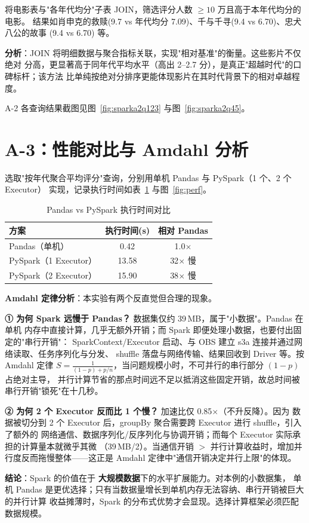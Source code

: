 将电影表与"各年代均分"子表 JOIN，筛选评分人数 $\geq 10$ 万且高于本年代均分的电影。
结果如肖申克的救赎(9.7 vs 年代均分 7.09)、千与千寻(9.4 vs 6.70)、忠犬八公的故事
(9.4 vs 6.70) 等。

\textbf{分析}：JOIN 将明细数据与聚合指标关联，实现"相对基准"的衡量。这些影片不仅绝对
分高，更显著高于同年代平均水平（高出 2--2.7 分），是真正"超越时代"的口碑标杆；该方法
比单纯按绝对分排序更能体现影片在其时代背景下的相对卓越程度。

A-2 各查询结果截图见图~\ref{fig:sparka2q123} 与图~\ref{fig:sparka2q45}。


\section{A-3：性能对比与 Amdahl 分析}

选取"按年代聚合平均评分"查询，分别用单机 Pandas 与 PySpark（1 个、2 个 Executor）
实现，记录执行时间如表~\ref{tab:perf} 与图~\ref{fig:perf}。

\begin{table}[htbp]\centering
\caption{Pandas vs PySpark 执行时间对比}\label{tab:perf}
\begin{tabular}{lcc}
\toprule
方案 & 执行时间(s) & 相对 Pandas \\
\midrule
Pandas（单机） & 0.42  & 1.0$\times$ \\
PySpark（1 Executor） & 13.58 & 32$\times$ 慢 \\
PySpark（2 Executor） & 15.90 & 38$\times$ 慢 \\
\bottomrule
\end{tabular}
\end{table}


\textbf{Amdahl 定律分析}：本实验有两个反直觉但合理的现象。

\textbf{① 为何 Spark 远慢于 Pandas？} 数据集仅约 39\,MB，属于"小数据"。Pandas 在单机
内存中直接计算，几乎无额外开销；而 Spark 即便处理小数据，也要付出固定的"串行开销"：
SparkContext/Executor 启动、与 OBS 建立 s3a 连接并通过网络读取、任务序列化与分发、
shuffle 落盘与网络传输、结果回收到 Driver 等。按 Amdahl 定律
$S=\frac{1}{(1-p)+p/n}$，当问题规模小时，不可并行的串行部分 $(1-p)$ 占绝对主导，
并行计算节省的那点时间远不足以抵消这些固定开销，故总时间被串行开销"锁死"在十几秒。

\textbf{② 为何 2 个 Executor 反而比 1 个慢？} 加速比仅 0.85$\times$（不升反降）。因为
数据被切分到 2 个 Executor 后，groupBy 聚合需要跨 Executor 进行 shuffle，引入了额外的
网络通信、数据序列化/反序列化与协调开销；而每个 Executor 实际承担的计算量本就微乎其微
（39\,MB/2）。当通信开销 $>$ 并行计算收益时，增加并行度反而拖慢整体——这正是 Amdahl
定律中"通信开销决定并行上限"的体现。

\textbf{结论}：Spark 的价值在于 \textbf{大规模数据}下的水平扩展能力。对本例的小数据集，
单机 Pandas 是更优选择；只有当数据量增长到单机内存无法容纳、串行开销被巨大的并行计算
收益摊薄时，Spark 的分布式优势才会显现。选择计算框架必须匹配数据规模。
